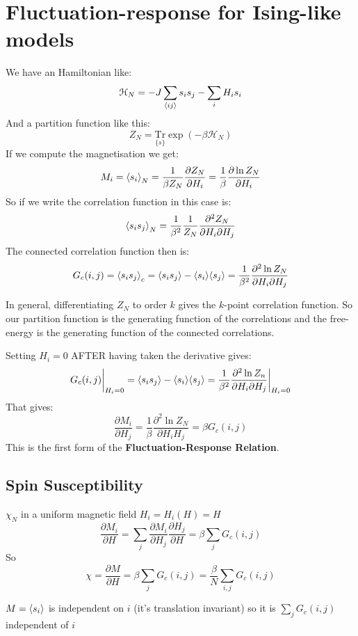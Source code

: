 \documentclass[../../Main/Main.tex]{subfiles}
\begin{document}
\section{Fluctuation-response for Ising-like models}

We have an Hamiltonian like:
$$\mathcal{H}_{N} = -J \sum_{{\left< {ij} \right>} }s_{i}s_{j} - \sum_{i}H_{i}s_{i}$$
And a partition function like this:
$$Z_{N} = \underset{\{ s \}}{\text{Tr}}\exp(-\beta \mathcal{H}_{N})$$
If we compute the magnetisation we get:
$$M_{i} = {\left< s_{i} \right>} _{N} = \frac{1}{\beta Z_{N}} \frac{ \partial Z_{N} }{ \partial H_{i} } = \frac{1}{\beta} \frac{ \partial  \ln Z_{N} }{ \partial H_{i} } $$
So if we write the correlation function in this case is:
$${\left< s_{i}s_{j} \right>}_{N} = \frac{1}{\beta^{2}} \frac{1}{Z_{N}} \frac{ \partial^{2} Z_{N} }{ \partial H_{i}\partial H_{j} } $$
The connected correlation function then is:
$$
G_{c}(i,j) = {\left< s_{i}s_{j} \right>}_{c} = {\left< s_{i}s_{j} \right>}  - {\left< s_{i} \right>} {\left< s_{j} \right>} = \frac{1}{\beta^{2}}\frac{ \partial^{2}\ln Z_{N} }{ \partial H_{i}\partial H_{j} }
$$
\begin{remark}
In general, differentiating $Z_{N}$ to order $k$ gives the $k$-point correlation function. So our partition function is the generating function of the correlations and the free-energy is the generating function of the connected correlations.
\end{remark}
Setting $H_{i} = 0$ AFTER having taken the derivative gives:
$$
G_{c}(i,j)\bigg\rvert_{H_{i}=0} = {\left< s_{i}s_{j} \right>} - {\left< s_{i} \right>} {\left< s_{j} \right>} = \frac{1}{\beta^{2}}\frac{ \partial^{2}\ln Z_{n} }{ \partial H_{i}\partial H_{j} }\bigg\rvert_{H_{i}= 0} 
$$
That gives:
$$\frac{ \partial M_{i} }{ \partial H_{j} } = \frac{1}{\beta}\frac{ \partial ^{2}\ln Z_{N} }{ \partial H_{i}H_{j} } = \beta G_{c}(i,j) $$
This is the first form of the \textbf{Fluctuation-Response Relation}.
\subsection*{Spin Susceptibility}
$\chi_{N}$ in a uniform magnetic field $H_{i} = H_{i}(H) = H$ 
$$\frac{ \partial M_{i} }{ \partial H }  = \sum_{j} \frac{ \partial M_{i} }{ \partial H_{j} } \frac{ \partial H_{j} }{ \partial H } = \beta \sum_{j}G_{c}(i,j)$$
So
$$\chi = \frac{ \partial M }{ \partial H } = \beta \sum_{j}G_{c}(i,j) = \frac{\beta}{N}\sum_{i,j} G_{c}(i,j)$$
\begin{remark}
$M = {\left< s_{i} \right>}$ is independent on $i$ (it's translation invariant) so it is $\sum_{j}G_{c}(i,j)$ independent of $i$
\end{remark}
\end{document}
